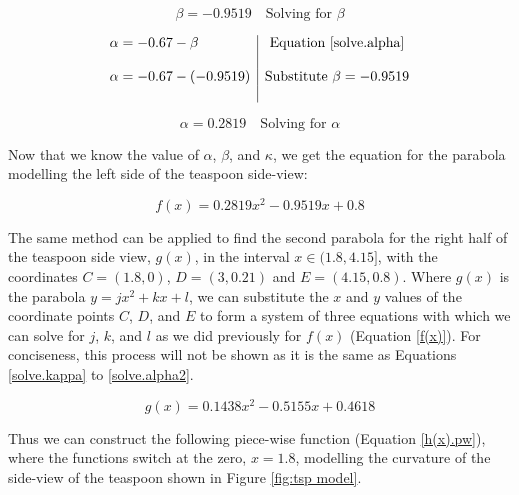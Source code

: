 \documentclass[12pt]{article}
\begin{document}
\begin{equation}\label{solve.beta}
    \boxed{ \beta = -0.9519}  \quad \text{Solving for } \beta
\end{equation}

$$
\begin{array}{l|c}
    \alpha = -0.67 - \beta & \text{Equation \ref{solve.alpha}}\\ \\
    \alpha = -0.67 -(-0.9519) & \text{Substitute } \beta =-0.9519 \\ \\
 \end{array} 
$$

\vspace{-5mm}

\begin{equation}\label{solve.alpha2}
    \boxed{ \alpha = 0.2819}  \quad \text{Solving for } \alpha
\end{equation}

Now that we know the value of $\alpha$, $\beta$, and $\kappa$, we get the equation for the parabola modelling the left side of the teaspoon side-view:

\vspace{-5mm}

\begin{equation}\label{f(x)}
    \boxed{f(x)=0.2819x^2 -0.9519x +0.8}
\end{equation}

The same method can be applied to find the second parabola for the right half of the teaspoon side view, $g(x)$, in the interval $x \in (1.8, 4.15]$, with the coordinates $C = (1.8,0)$, $D= (3,0.21)$ and $E=(4.15,0.8)$. Where $g(x)$ is the parabola $y=jx^2+kx+l$, we can substitute the $x$ and $y$ values of the coordinate points $C$, $D$, and $E$ to form a system of three equations with which we can solve for $j$, $k$, and $l$ as we did previously for $f(x)$ (Equation \ref{f(x)}). For conciseness, this process will not be shown as it is the same as Equations \ref{solve.kappa} to \ref{solve.alpha2}.

\vspace{-5mm}

\begin{equation}\label{g(x)}
    \boxed{g(x)= 0.1438x^2 -0.5155x + 0.4618}
\end{equation}

Thus we can construct the following piece-wise function (Equation \ref{h(x).pw}), where the functions switch at the zero, $x=1.8$, modelling the curvature of the side-view of the teaspoon shown in Figure \ref{fig:tsp model}.
\end{document}

